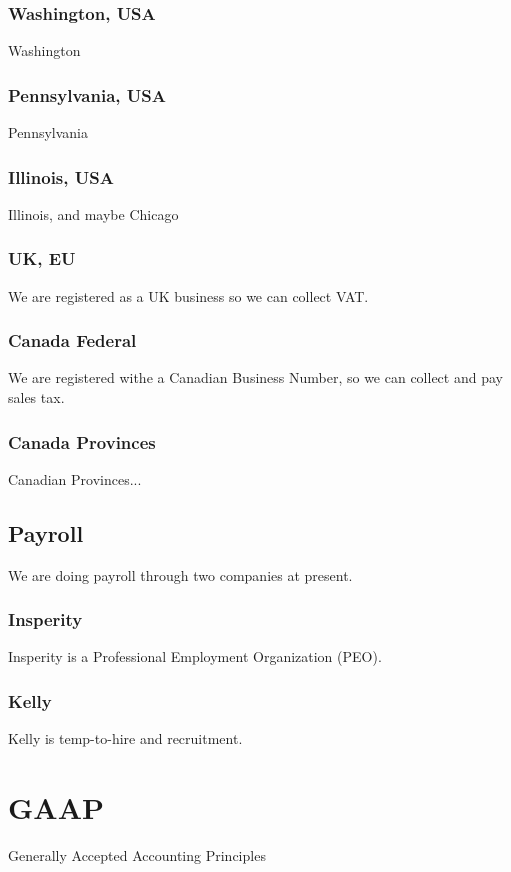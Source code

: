\subsubsection{Washington, USA}
Washington

\subsubsection{Pennsylvania, USA}
Pennsylvania

\subsubsection{Illinois, USA}
Illinois, and maybe Chicago

\subsubsection{UK, EU}
We are registered as a UK business so we can collect VAT.

\subsubsection{Canada Federal}
We are registered withe a Canadian Business Number, so we
can collect and pay sales tax.

\subsubsection{Canada Provinces}
Canadian Provinces...

\subsection{Payroll}
We are doing payroll through two companies at present.

\subsubsection{Insperity}
Insperity is a Professional Employment Organization (PEO).

\subsubsection{Kelly}
Kelly is temp-to-hire and recruitment.

\section{GAAP}
Generally Accepted Accounting Principles

